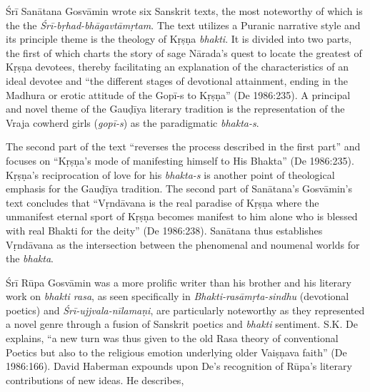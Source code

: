 Śrī Sanātana Gosvāmin wrote six Sanskrit texts, the most noteworthy of which is the the {\sl Śrī-bṛhad-bhāgavtāmṛtam}. The text utilizes a Puranic narrative style and its principle theme is the theology of Kṛṣṇa {\sl bhakti}. It is divided into two parts, the first of which charts the story of sage Nārada’s quest to locate the greatest of Kṛṣṇa devotees, thereby facilitating an explanation of the characteristics of an ideal devotee and “the different stages of devotional attainment, ending in the Madhura or erotic attitude of the Gopī-s to Kṛṣṇa” (De 1986:235). A principal and novel theme of the Gauḍīya literary tradition is the representation of the Vraja cowherd girls ({\sl gopī-s}) as the paradigmatic {\sl bhakta-s}.

The second part of the text “reverses the process described in the first part” and focuses on “Kṛṣṇa’s mode of manifesting himself to His Bhakta” (De 1986:235). Kṛṣṇa’s reciprocation of love for his {\sl bhakta-s} is another point of theological emphasis for the Gauḍīya tradition. The second part of Sanātana’s Gosvāmin’s text concludes that “Vṛndāvana is the real paradise of Kṛṣṇa where the unmanifest eternal sport of Kṛṣṇa becomes manifest to him alone who is blessed with real Bhakti for the deity” (De 1986:238). Sanātana thus establishes Vṛndāvana as the intersection between the phenomenal and noumenal worlds for the {\sl bhakta}. 

Śrī Rūpa Gosvāmin was a more prolific writer than his brother and his literary work on {\sl bhakti rasa}, as seen specifically in {\sl Bhakti-rasāmṛta-sindhu} (devotional poetics) and {\sl Śrī-ujjvala-nīlamaṇi}, are particularly noteworthy as they represented a novel genre through a fusion of Sanskrit poetics and {\sl bhakti} sentiment. S.K. De explains, “a new turn was thus given to the old Rasa theory of conventional Poetics but also to the religious emotion underlying older Vaiṣṇava faith” (De 1986:166). David Haberman expounds upon De’s recognition of Rūpa’s literary contributions of new ideas. He describes, 
\vskip 3pt

